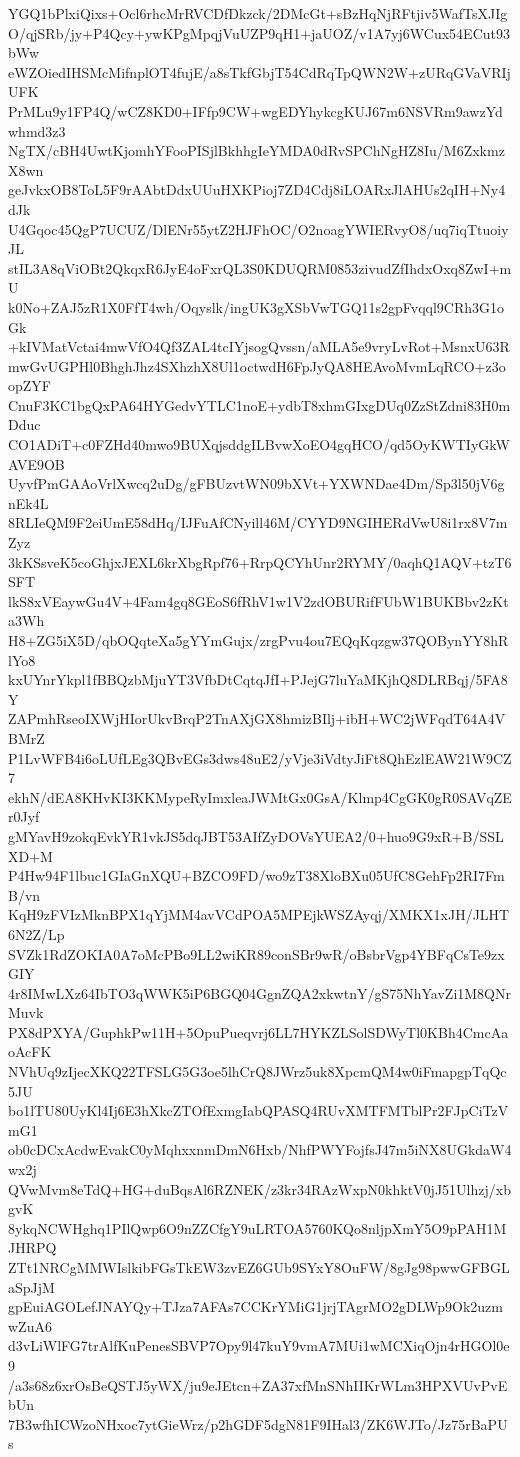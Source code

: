 YGQ1bPlxiQixs+Ocl6rhcMrRVCDfDkzck/2DMcGt+sBzHqNjRFtjiv5WafTsXJIg
O/qjSRb/jy+P4Qcy+ywKPgMpqjVuUZP9qH1+jaUOZ/v1A7yj6WCux54ECut93bWw
eWZOiedIHSMcMifnplOT4fujE/a8sTkfGbjT54CdRqTpQWN2W+zURqGVaVRIjUFK
PrMLu9y1FP4Q/wCZ8KD0+IFfp9CW+wgEDYhykcgKUJ67m6NSVRm9awzYdwhmd3z3
NgTX/cBH4UwtKjomhYFooPISjlBkhhgIeYMDA0dRvSPChNgHZ8Iu/M6ZxkmzX8wn
geJvkxOB8ToL5F9rAAbtDdxUUuHXKPioj7ZD4Cdj8iLOARxJlAHUs2qIH+Ny4dJk
U4Gqoc45QgP7UCUZ/DlENr55ytZ2HJFhOC/O2noagYWIERvyO8/uq7iqTtuoiyJL
stIL3A8qViOBt2QkqxR6JyE4oFxrQL3S0KDUQRM0853zivudZfIhdxOxq8ZwI+mU
k0No+ZAJ5zR1X0FfT4wh/Oqyslk/ingUK3gXSbVwTGQ11s2gpFvqql9CRh3G1oGk
+kIVMatVctai4mwVfO4Qf3ZAL4tcIYjsogQvssn/aMLA5e9vryLvRot+MsnxU63R
mwGvUGPHl0BhghJhz4SXhzhX8Ul1octwdH6FpJyQA8HEAvoMvmLqRCO+z3oopZYF
CnuF3KC1bgQxPA64HYGedvYTLC1noE+ydbT8xhmGIxgDUq0ZzStZdni83H0mDduc
CO1ADiT+c0FZHd40mwo9BUXqjsddgILBvwXoEO4gqHCO/qd5OyKWTIyGkWAVE9OB
UyvfPmGAAoVrlXwcq2uDg/gFBUzvtWN09bXVt+YXWNDae4Dm/Sp3l50jV6gnEk4L
8RLIeQM9F2eiUmE58dHq/IJFuAfCNyill46M/CYYD9NGIHERdVwU8i1rx8V7mZyz
3kKSsveK5coGhjxJEXL6krXbgRpf76+RrpQCYhUnr2RYMY/0aqhQ1AQV+tzT6SFT
lkS8xVEaywGu4V+4Fam4gq8GEoS6fRhV1w1V2zdOBURifFUbW1BUKBbv2zKta3Wh
H8+ZG5iX5D/qbOQqteXa5gYYmGujx/zrgPvu4ou7EQqKqzgw37QOBynYY8hRlYo8
kxUYnrYkpl1fBBQzbMjuYT3VfbDtCqtqJfI+PJejG7luYaMKjhQ8DLRBqj/5FA8Y
ZAPmhRseoIXWjHIorUkvBrqP2TnAXjGX8hmizBIlj+ibH+WC2jWFqdT64A4VBMrZ
P1LvWFB4i6oLUfLEg3QBvEGs3dws48uE2/yVje3iVdtyJiFt8QhEzlEAW21W9CZ7
ekhN/dEA8KHvKI3KKMypeRyImxleaJWMtGx0GsA/Klmp4CgGK0gR0SAVqZEr0Jyf
gMYavH9zokqEvkYR1vkJS5dqJBT53AIfZyDOVsYUEA2/0+huo9G9xR+B/SSLXD+M
P4Hw94F1lbuc1GIaGnXQU+BZCO9FD/wo9zT38XloBXu05UfC8GehFp2RI7FmB/vn
KqH9zFVIzMknBPX1qYjMM4avVCdPOA5MPEjkWSZAyqj/XMKX1xJH/JLHT6N2Z/Lp
SVZk1RdZOKIA0A7oMcPBo9LL2wiKR89conSBr9wR/oBsbrVgp4YBFqCsTe9zxGIY
4r8IMwLXz64IbTO3qWWK5iP6BGQ04GgnZQA2xkwtnY/gS75NhYavZi1M8QNrMuvk
PX8dPXYA/GuphkPw11H+5OpuPueqvrj6LL7HYKZLSolSDWyTl0KBh4CmcAaoAcFK
NVhUq9zIjecXKQ22TFSLG5G3oe5lhCrQ8JWrz5uk8XpcmQM4w0iFmapgpTqQc5JU
bo1lTU80UyKl4Ij6E3hXkcZTOfExmgIabQPASQ4RUvXMTFMTblPr2FJpCiTzVmG1
ob0cDCxAcdwEvakC0yMqhxxnmDmN6Hxb/NhfPWYFojfsJ47m5iNX8UGkdaW4wx2j
QVwMvm8eTdQ+HG+duBqsAl6RZNEK/z3kr34RAzWxpN0khktV0jJ51Ulhzj/xbgvK
8ykqNCWHghq1PIlQwp6O9nZZCfgY9uLRTOA5760KQo8nljpXmY5O9pPAH1MJHRPQ
ZTt1NRCgMMWIslkibFGsTkEW3zvEZ6GUb9SYxY8OuFW/8gJg98pwwGFBGLaSpJjM
gpEuiAGOLefJNAYQy+TJza7AFAs7CCKrYMiG1jrjTAgrMO2gDLWp9Ok2uzmwZuA6
d3vLiWlFG7trAlfKuPenesSBVP7Opy9l47kuY9vmA7MUi1wMCXiqOjn4rHGOl0e9
/a3s68z6xrOsBeQSTJ5yWX/ju9eJEtcn+ZA37xfMnSNhIIKrWLm3HPXVUvPvEbUn
7B3wfhICWzoNHxoc7ytGieWrz/p2hGDF5dgN81F9IHal3/ZK6WJTo/Jz75rBaPUs

